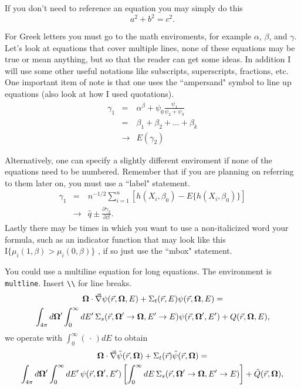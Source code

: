 If you don't need to reference an equation you may simply do this 
\[
  a^2 + b^2 = c^2.
\]

For Greek letters you must go to the math enviroments, for example 
$\alpha$, $\beta$, and $\gamma$.  Let's look at equations that cover 
multiple lines, none of these equations may be true or mean anything, but so 
that the reader can get some ideas.  In addition I will use some other useful 
notations like subscripts, superscripts, fractions, etc.  One important item 
of note is that one uses the ``ampersand" symbol to line up equations 
(also look at how I used quotations).
%
\begin{eqnarray}
\gamma_1 & = & \alpha^{\beta} + \psi_0 \frac{\psi_1}{\psi_2+\psi_3} \label{eq.two} \\
& = & \beta_1 + \beta_2 + \ldots + \beta_k \nonumber\\
& \rightarrow & E(\gamma_2) 
\end{eqnarray}

Alternatively, one can specify a slightly different enviroment if none of 
the equations need to be numbered.  Remember that if you are planning on 
referring to them later on, you must use a ``label" statement.
%
\begin{eqnarray*}
\gamma_1 & = & n^{-1/2} \displaystyle \sum_{i=1}^n \left[h(X_i,\beta_0)-E\{h(X_i,\beta_0)\}\right]\\
& \rightarrow & \hat q \pm \frac{\partial \gamma_2}{\partial \beta}. 
\end{eqnarray*}  
Lastly there may be times in which you want to use a non-italicized word 
your formula, such as an indicator function that may look like this 
$\mbox{I}\{\mu_i(1,\beta)>\mu_i(0,\beta)\}$ , if so just use the 
``mbox" statement.


You could use a multiline equation for long equations.  The environment
is \texttt{multline}.  Insert \verb^\\^ for line breaks.
\begin{multline*}
  \boldsymbol{\Omega} \cdot \vec{\nabla} \psi(\vec{r},\boldsymbol{\Omega},E)
   + \Sigma_t(\vec{r},E)\psi(\vec{r},\boldsymbol{\Omega},E) = \\
  \int_{4\pi} d\boldsymbol{\Omega}' \int_0^{\infty} dE' \, 
  \Sigma_s(\vec{r},\boldsymbol{\Omega}'\to\boldsymbol{\Omega},E'\to E)\psi(\vec{r},\boldsymbol{\Omega}',E')
  + Q(\vec{r},\boldsymbol{\Omega},E),
\end{multline*}
we operate with $\displaystyle\int_{0}^{\infty}\left(\,\cdot\,\right) dE$
to obtain
\begin{multline*}
  \boldsymbol{\Omega} \cdot \vec{\nabla} \tilde{\psi}(\vec{r},\boldsymbol{\Omega})
  + \Sigma_t(\vec{r})\tilde{\psi}(\vec{r},\boldsymbol{\Omega}) = \\
  \int_{4\pi} d\boldsymbol{\Omega}' \int_0^{\infty} dE' \, \psi(\vec{r},\boldsymbol{\Omega}',E')
  \left [ \int_{0}^{\infty} dE \, \Sigma_s(\vec{r},\boldsymbol{\Omega}'\to\boldsymbol{\Omega},E'\to E)
  \right ] + \tilde{Q}(\vec{r},\boldsymbol{\Omega}),
\end{multline*}
